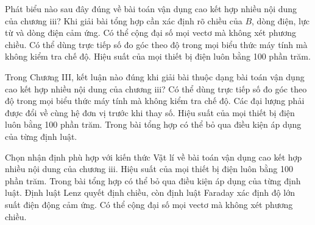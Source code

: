 \begin{ex}
Phát biểu nào sau đây đúng về bài toán vận dụng cao kết hợp nhiều nội dung của chương iii?
\choice
{\True Khi giải bài tổng hợp cần xác định rõ chiều của $B$, dòng điện, lực từ và dòng điện cảm ứng.}
{Có thể cộng đại số mọi vectơ mà không xét phương chiều.}
{Có thể dùng trực tiếp số đo góc theo độ trong mọi biểu thức máy tính mà không kiểm tra chế độ.}
{Hiệu suất của mọi thiết bị điện luôn bằng 100 phần trăm.}
\end{ex}

\begin{ex}
Trong Chương III, kết luận nào đúng khi giải bài thuộc dạng bài toán vận dụng cao kết hợp nhiều nội dung của chương iii?
\choice
{Có thể dùng trực tiếp số đo góc theo độ trong mọi biểu thức máy tính mà không kiểm tra chế độ.}
{\True Các đại lượng phải được đổi về cùng hệ đơn vị trước khi thay số.}
{Hiệu suất của mọi thiết bị điện luôn bằng 100 phần trăm.}
{Trong bài tổng hợp có thể bỏ qua điều kiện áp dụng của từng định luật.}
\end{ex}

\begin{ex}
Chọn nhận định phù hợp với kiến thức Vật lí về bài toán vận dụng cao kết hợp nhiều nội dung của chương iii.
\choice
{Hiệu suất của mọi thiết bị điện luôn bằng 100 phần trăm.}
{Trong bài tổng hợp có thể bỏ qua điều kiện áp dụng của từng định luật.}
{\True Định luật Lenz quyết định chiều, còn định luật Faraday xác định độ lớn suất điện động cảm ứng.}
{Có thể cộng đại số mọi vectơ mà không xét phương chiều.}
\end{ex}

